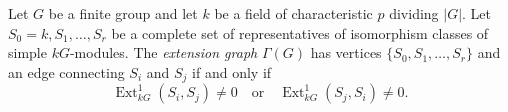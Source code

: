 Let $G$ be a finite group and let $k$ be a field of characteristic $p$ dividing $|G|$. Let $S_0 = k, S_1, \ldots, S_r$ be a complete set of representatives of isomorphism classes of simple $kG$-modules. The {\it extension graph} $\Gamma(G)$ has vertices $\{S_0, S_1, \ldots, S_r\}$ and an edge connecting $S_i$ and $S_j$ if and only if
\[
\operatorname{Ext}_{kG}^1(S_i, S_j) \neq 0 \quad \text{or} \quad \operatorname{Ext}_{kG}^1(S_j, S_i) \neq 0.
\]
